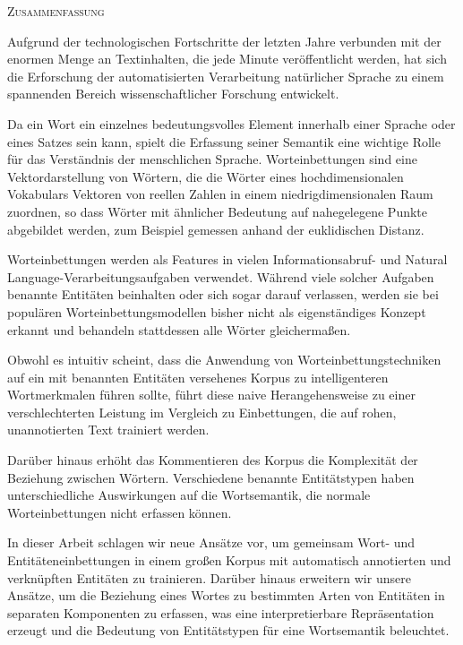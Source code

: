 \begin{center}
  \textsc{Zusammenfassung}
\end{center}
\noindent

Aufgrund der technologischen Fortschritte der letzten Jahre verbunden mit der enormen Menge an Textinhalten, die jede Minute veröffentlicht werden, hat sich die  Erforschung der automatisierten Verarbeitung natürlicher Sprache zu einem spannenden Bereich wissenschaftlicher Forschung entwickelt.

Da ein Wort ein einzelnes bedeutungsvolles Element innerhalb einer Sprache oder eines Satzes sein kann, spielt die Erfassung seiner Semantik eine wichtige Rolle für das Verständnis der menschlichen Sprache.
Worteinbettungen sind eine Vektordarstellung von Wörtern, die die Wörter eines hochdimensionalen Vokabulars Vektoren von reellen Zahlen in einem niedrigdimensionalen Raum zuordnen, so dass Wörter mit ähnlicher Bedeutung auf nahegelegene Punkte abgebildet werden, zum Beispiel gemessen anhand der euklidischen Distanz.

Worteinbettungen werden als Features in vielen Informationsabruf- und Natural Language-Verarbeitungsaufgaben verwendet. Während viele solcher Aufgaben benannte Entitäten beinhalten oder sich sogar darauf verlassen, werden sie bei populären Worteinbettungsmodellen bisher nicht als eigenständiges Konzept erkannt und behandeln stattdessen alle Wörter gleichermaßen.

Obwohl es intuitiv scheint, dass die Anwendung von Worteinbettungstechniken auf ein mit benannten Entitäten versehenes Korpus zu intelligenteren Wortmerkmalen führen sollte, führt diese naive Herangehensweise zu einer verschlechterten Leistung im Vergleich zu Einbettungen, die auf rohen, unannotierten Text trainiert werden.

Darüber hinaus erhöht das Kommentieren des Korpus die Komplexität der Beziehung zwischen Wörtern. Verschiedene benannte Entitätstypen haben unterschiedliche Auswirkungen auf die Wortsemantik, die normale Worteinbettungen nicht erfassen können.

In dieser Arbeit schlagen wir neue Ansätze vor, um gemeinsam Wort- und Entitäteneinbettungen in einem großen Korpus mit automatisch annotierten und verknüpften Entitäten zu trainieren.
Darüber hinaus erweitern wir unsere Ansätze, um die Beziehung eines Wortes zu bestimmten Arten von Entitäten in separaten Komponenten zu erfassen, was eine interpretierbare Repräsentation erzeugt und die Bedeutung von Entitätstypen für eine Wortsemantik beleuchtet.

